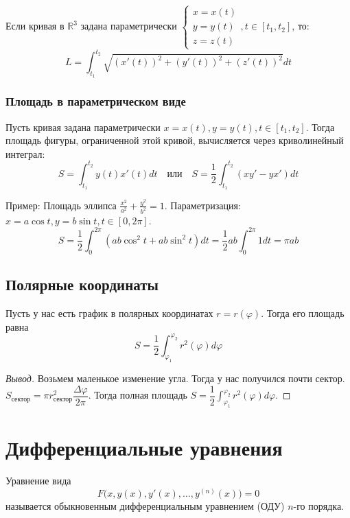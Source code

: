 \documentclass[12pt]{article}
\newcommand{\dint}{\displaystyle\int}
\begin{document}
	\noindent
	Если кривая в $\mathbb{R}^3$ задана параметрически $\begin{cases} x = x(t) \\ y = y(t) \\ z = z(t) \end{cases}, t \in [t_1, t_2]$, то:
	$$ L = \dint_{t_1}^{t_2} \sqrt{(x'(t))^2 + (y'(t))^2 + (z'(t))^2} dt $$

	\subsubsection{Площадь в параметрическом виде}
	\begin{statement}
		Пусть кривая задана параметрически $x = x(t), y = y(t), t \in [t_1, t_2]$. Тогда площадь фигуры, ограниченной этой кривой, вычисляется через криволинейный интеграл:
		$$ S = \dint_{t_1}^{t_2} y(t) x'(t) dt \quad \text{или} \quad S = \frac{1}{2} \dint_{t_1}^{t_2} (x y' - y x') dt $$
	\end{statement}
	\noindent
	Пример: Площадь эллипса $\frac{x^2}{a^2} + \frac{y^2}{b^2} = 1$. Параметризация: $x = a \cos t, y = b \sin t, t \in [0, 2\pi]$.
	$$ S = \frac{1}{2} \dint_0^{2\pi} (ab \cos^2 t + ab \sin^2 t) dt = \frac{1}{2} ab \dint_0^{2\pi} 1 dt = \pi ab $$

    \subsection{Полярные координаты}

    \begin{statement}
        Пусть у нас есть график в полярных координатах $r = r(\varphi)$. Тогда его площадь равна $$S = \dfrac{1}{2} \dint_{\varphi_1}^{\varphi_2} r^2(\varphi) d \varphi$$
    \end{statement}

    \begin{proof}[Вывод]
        Возьмем маленькое изменение угла. Тогда у нас получился почти сектор. $S_{\text{сектор}} = \pi r_{\text{сектор}}^2 \dfrac{\varDelta \varphi}{2 \pi}$. Тогда полная площадь $S = \dfrac{1}{2} \dint_{\varphi_1}^{\varphi_2} r^2(\varphi) d \varphi$.
    \end{proof}
    
    \section{Дифференциальные уравнения}
    
    \begin{definition}
    	Уравнение вида
    	\[
    		F\bigl(x, y(x), y'(x), \dots, y^{(n)}(x)\bigr) = 0
    	\]
    	называется обыкновенным дифференциальным уравнением (ОДУ) $n$-го порядка.
    \end{definition}
    
\end{document}

